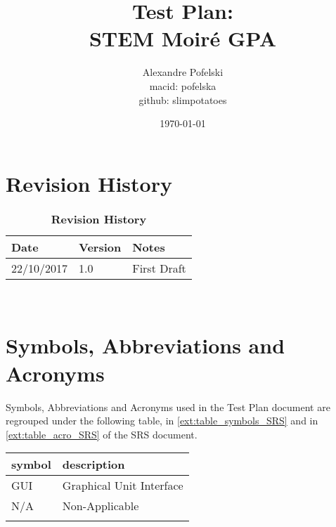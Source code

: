 \documentclass[12pt, titlepage]{article}
\begin{document}
\title{Test Plan:\\
		STEM Moir{\'e} GPA} 
\author{Alexandre Pofelski \\
		macid: pofelska \\
		github: slimpotatoes}
\date{\today}
	
\maketitle


\section{Revision History}

\begin{table}[h]
\caption{\bf Revision History}
\begin{tabularx}{\textwidth}{p{3cm}p{2cm}X}
\toprule {\bf Date} & {\bf Version} & {\bf Notes}\\
\midrule
22/10/2017 & 1.0 & First Draft\\
\bottomrule
\end{tabularx}
\end{table}

~\newpage

\section{Symbols, Abbreviations and Acronyms}
\label{symbols}

Symbols, Abbreviations and Acronyms used in the Test Plan document are regrouped under the following table, in \cref{ext:table_symbols_SRS} and in \cref{ext:table_acro_SRS} of the SRS document. \par\medskip

\renewcommand{\arraystretch}{1.2}
\begin{tabular}{l l} 
  \toprule		
  \textbf{symbol} & \textbf{description}\\
  \midrule 
  GUI & Graphical Unit Interface \\
  N/A & Non-Applicable \\
  \bottomrule
  \label{table_acro_Test_Plan}
\end{tabular}


\newpage

\tableofcontents

\listoftables

\newpage
\end{document}
